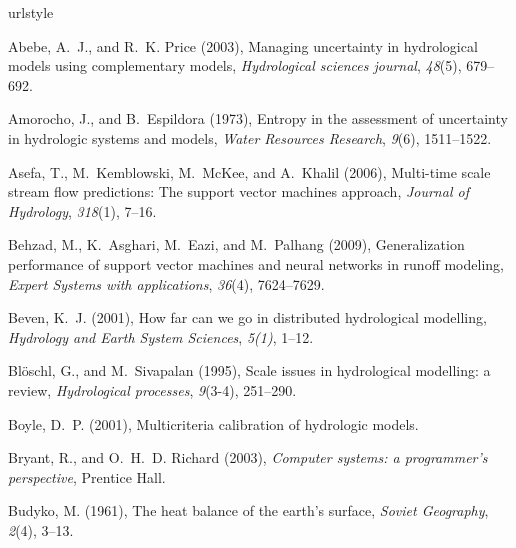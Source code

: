 \documentclass[draft,wrr]{AGUTeX}
\begin{document}
\begin{article}
\begin{thebibliography}{59}
\providecommand{\natexlab}[1]{#1}
\expandafter\ifx\csname urlstyle\endcsname\relax
  \providecommand{\doi}[1]{doi:\discretionary{}{}{}#1}\else
  \providecommand{\doi}{doi:\discretionary{}{}{}\begingroup
  \urlstyle{rm}\Url}\fi


Abebe, A.~J., and R.~K. Price (2003), Managing uncertainty in hydrological
  models using complementary models, \textit{Hydrological sciences journal},
  \textit{48}(5), 679--692.

Amorocho, J., and B.~Espildora (1973), Entropy in the assessment of uncertainty
  in hydrologic systems and models, \textit{Water Resources Research},
  \textit{9}(6), 1511--1522.

Asefa, T., M.~Kemblowski, M.~McKee, and A.~Khalil (2006), Multi-time scale
  stream flow predictions: The support vector machines approach,
  \textit{Journal of Hydrology}, \textit{318}(1), 7--16.

Behzad, M., K.~Asghari, M.~Eazi, and M.~Palhang (2009), Generalization
  performance of support vector machines and neural networks in runoff
  modeling, \textit{Expert Systems with applications}, \textit{36}(4),
  7624--7629.

Beven, K.~J. (2001), How far can we go in distributed hydrological modelling,
  \textit{Hydrology and Earth System Sciences}, \textit{5(1)}, 1--12.

Bl{\"o}schl, G., and M.~Sivapalan (1995), Scale issues in hydrological
  modelling: a review, \textit{Hydrological processes}, \textit{9}(3-4),
  251--290.

Boyle, D.~P. (2001), Multicriteria calibration of hydrologic models.

Bryant, R., and O.~H.~D. Richard (2003), \textit{Computer systems: a
  programmer's perspective}, Prentice Hall.

Budyko, M. (1961), The heat balance of the earth's surface, \textit{Soviet
  Geography}, \textit{2}(4), 3--13.


\end{thebibliography}
\end{article}
\end{document}
